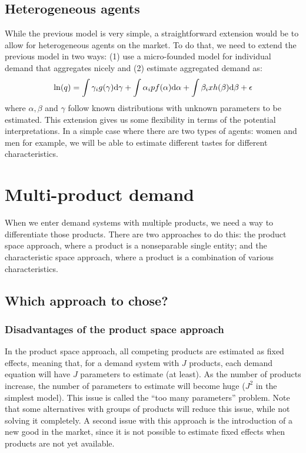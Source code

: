 \subsection{Heterogeneous agents}

While the previous model is very simple, a straightforward extension would be to allow for heterogeneous agents on the market. To do that, we need to extend the previous model in two ways: (1) use a micro-founded model for individual demand that aggregates nicely and (2) estimate aggregated demand as: $$ \ln(q) = \int \gamma_i g(\gamma)\mathrm{d}\gamma + \int \alpha_i p f(\alpha)\mathrm{d}\alpha + \int \beta_i x h(\beta)\mathrm{d}\beta + \epsilon $$ where $\alpha, \beta$ and $\gamma$ follow known distributions with unknown parameters to be estimated. This extension gives us some flexibility in terms of the potential interpretations. In a simple case where there are two types of agents: women and men for example, we will be able to estimate different tastes for different characteristics.

\section{Multi-product demand}

When we enter demand systems with multiple products, we need a way to differentiate those products. There are two approaches to do this: the product space approach, where a product is a nonseparable single entity; and the characteristic space approach, where a product is a combination of various characteristics.

\subsection{Which approach to chose?}

\subsubsection{Disadvantages of the product space approach}

In the product space approach, all competing products are estimated as fixed effects, meaning that, for a demand system with $J$ products, each demand equation will have $J$ parameters to estimate (at least). As the number of products increase, the number of parameters to estimate will become huge ($J^2$ in the simplest model). This issue is called the ``too many parameters'' problem. Note that some alternatives with groups of products will reduce this issue, while not solving it completely. A second issue with this approach is the introduction of a new good in the market, since it is not possible to estimate fixed effects when products are not yet available.

